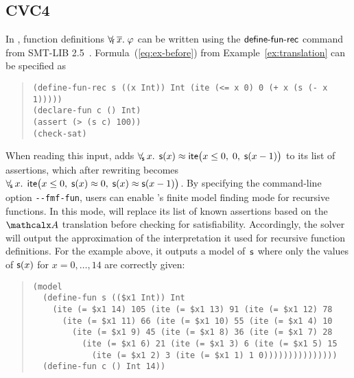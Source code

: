 
\subsection{CVC4}
\label{ssec:cvc4}


In \cvc, function definitions $\forall_{\!\mathsf{f}\:} \overline{x}.\; \varphi$ can be written using the $\mathsf{define}\text{-}\mathsf{fun}\text{-}\mathsf{rec}$ command
from SMT-LIB 2.5~\cite{smtlib25}.
Formula~(\ref{eq:ex-before}) from Example~\ref{ex:translation}
can be specified as %
%
\begin{quote}
\verb|(define-fun-rec s ((x Int)) Int (ite (<= x 0) 0 (+ x (s (- x 1)))))|\kern-200mm \\
\verb|(declare-fun c () Int)| \\
\verb|(assert (> (s c) 100))| \\
\verb|(check-sat)|
\end{quote}
%
When reading this input,
\cvc adds 
$\forall_{\!\mathsf{s}\:} x.\;\, \mathsf{s}( x ) \approx \mathsf{ite}\bigl( x \leq 0,\; 0,\; \mathsf{s}( x-1 )\bigr)$
to its list of assertions,
which after rewriting becomes
$\forall_{\!\mathsf{s}\:} x.\;\, \mathsf{ite}\bigl( x \leq 0,\; \mathsf{s}( x ) \approx 0,\; \mathsf{s}( x ) \approx \mathsf{s}( x-1 ) \bigr)$.
By specifying the command-line option \texttt{-}\texttt{-fmf-fun}, users
can enable \cvc's finite model finding mode for recursive functions.
In this mode, \cvc will replace its list of known
assertions based on the $\conv$ translation before checking for satisfiability.
Accordingly, the solver will output the approximation of the interpretation it
used for recursive function definitions.
For the example above, it outputs a %
model of~$\mathsf{s}$ where only
the values of $\mathsf{s}(x)$ for $x = 0,\dotsc,14$ are correctly given:
\begin{quote}
\begin{verbatim}
(model
  (define-fun s (($x1 Int)) Int
    (ite (= $x1 14) 105 (ite (= $x1 13) 91 (ite (= $x1 12) 78
      (ite (= $x1 11) 66 (ite (= $x1 10) 55 (ite (= $x1 4) 10
        (ite (= $x1 9) 45 (ite (= $x1 8) 36 (ite (= $x1 7) 28
          (ite (= $x1 6) 21 (ite (= $x1 3) 6 (ite (= $x1 5) 15
            (ite (= $x1 2) 3 (ite (= $x1 1) 1 0)))))))))))))))
  (define-fun c () Int 14))
\end{verbatim}
\end{quote}

